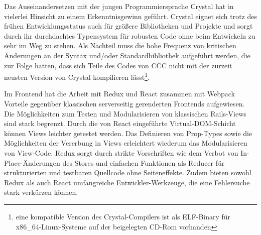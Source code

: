 Das Auseinandersetzen mit der jungen Programmiersprache Crystal hat in vielerlei
Hinsicht zu einem Erkenntnisgewinn geführt.  Crystal eignet sich trotz des
frühen Entwicklungsstatus auch für größere Bibliotheken und Projekte und sorgt
durch ihr durchdachtes Typensystem für robusten Code ohne beim Entwickeln zu
sehr im Weg zu stehen.  Als Nachteil muss die hohe Frequenz von kritischen
Änderungen an der Syntax und/oder Standardbibliothek aufgeführt werden, die zur
Folge hatten, dass sich Teile des Codes von CCC nicht mit der zurzeit neusten
Version von Crystal kompilieren lässt\footnote{eine kompatible Version des
Crystal-Compilers ist als ELF-Binary für x86\_64-Linux-Systeme auf der
beigelegten CD-Rom vorhanden}.

Im Frontend hat die Arbeit mit Redux und React zusammen mit Webpack Vorteile
gegenüber klassischen serverseitig gerenderten Frontends aufgewiesen.  Die
Möglichkeiten zum Testen und Modularisieren von klassischen Rails-Views sind
stark begrenzt.  Durch die von React eingeführte Virtual-DOM-Schicht können
Views leichter getestet werden.  Das Definieren von Prop-Types sowie die
Möglichkeiten der Vererbung in Views erleichtert wiederum das Modularisieren
von View-Code.  Redux sorgt durch strikte Vorschriften wie dem Verbot von 
In-Place-Änderungen des Stores und einfachen Funktionen als Reducer für
strukturierten und testbaren Quellcode ohne Seiteneffekte.  Zudem bieten sowohl
Redux als auch React umfangreiche Entwickler-Werkzeuge, die eine Fehlersuche
stark verkürzen können.
